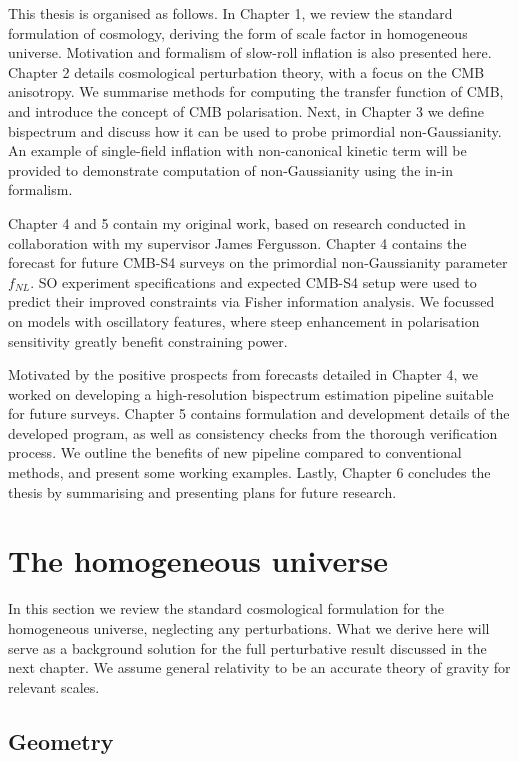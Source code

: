 This thesis is organised as follows. In Chapter 1, we review the standard formulation of cosmology, deriving the form of scale factor in homogeneous universe. Motivation and formalism of slow-roll inflation is also presented here. Chapter 2 details cosmological perturbation theory, with a focus on the CMB anisotropy. We summarise methods for computing the transfer function of CMB, and introduce the concept of CMB polarisation. Next, in Chapter 3 we define bispectrum and discuss how it can be used to probe primordial non-Gaussianity. An example of single-field inflation with non-canonical kinetic term will be provided to demonstrate computation of non-Gaussianity using the in-in formalism.

Chapter 4 and 5 contain my original work, based on research conducted in collaboration with my supervisor James Fergusson. Chapter 4 contains the forecast for future CMB-S4 surveys on the primordial non-Gaussianity parameter $f_{NL}$. SO experiment specifications and expected CMB-S4 setup were used to predict their improved constraints via Fisher information analysis. We focussed on models with oscillatory features, where steep enhancement in polarisation sensitivity greatly benefit constraining power.

Motivated by the positive prospects from forecasts detailed in Chapter 4, we worked on developing a high-resolution bispectrum estimation pipeline suitable for future surveys. Chapter 5 contains formulation and development details of the developed program, as well as consistency checks from the thorough verification process. We outline the benefits of new pipeline compared to conventional methods, and present some working examples. Lastly, Chapter 6 concludes the thesis by summarising and presenting plans for future research.

\section{The homogeneous universe}

In this section we review the standard cosmological formulation for the homogeneous universe, neglecting any perturbations. What we derive here will serve as a background solution for the full perturbative result discussed in the next chapter. We assume general relativity to be an accurate theory of gravity for relevant scales.

\subsection{Geometry}

